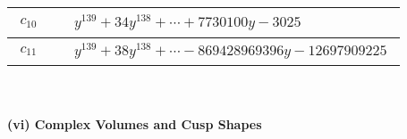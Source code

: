 \documentclass[1p]{elsarticle_modified}
\theoremstyle{definition}
\begin{document}
\begin{tabular}{m{50pt}|m{274pt}}
\hline $$\begin{aligned}c_{10}\end{aligned}$$&$\begin{aligned}
&y^{139}+34 y^{138}+\cdots+7730100 y-3025
\end{aligned}$\\
\hline $$\begin{aligned}c_{11}\end{aligned}$$&$\begin{aligned}
&y^{139}+38 y^{138}+\cdots-869428969396 y-12697909225
\end{aligned}$\\
\hline
\end{tabular}\\~\\
\newpage\flushleft \textbf{(vi) Complex Volumes and Cusp Shapes}
\end{document}
